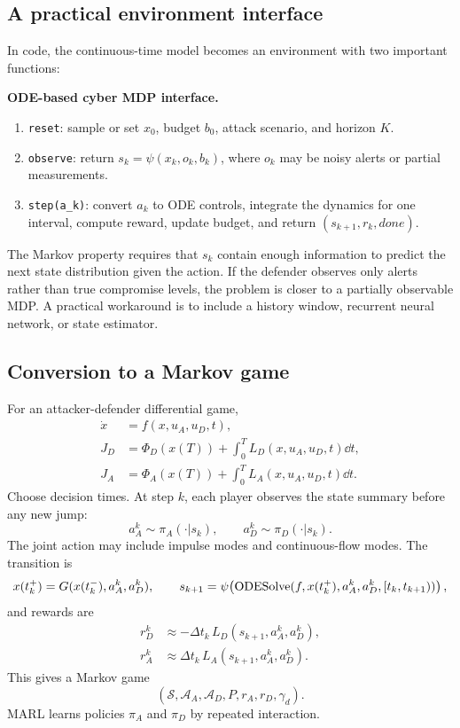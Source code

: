 \documentclass[11pt,a4paper]{article}
\begin{document}
\subsection{A practical environment interface}
In code, the continuous-time model becomes an environment with two important functions:
\begin{methodbox}
\textbf{ODE-based cyber MDP interface.}
\begin{enumerate}
\item \texttt{reset}: sample or set $x_0$, budget $b_0$, attack scenario, and horizon $K$.
\item \texttt{observe}: return $s_k=\psi(x_k,o_k,b_k)$, where $o_k$ may be noisy alerts or partial measurements.
\item \texttt{step(a\_k)}: convert $a_k$ to ODE controls, integrate the dynamics for one interval, compute reward, update budget, and return $(s_{k+1},r_k,done)$.
\end{enumerate}
\end{methodbox}
The Markov property requires that $s_k$ contain enough information to predict the next state distribution given the action. If the defender observes only alerts rather than true compromise levels, the problem is closer to a partially observable MDP. A practical workaround is to include a history window, recurrent neural network, or state estimator.

\subsection{Conversion to a Markov game}
For an attacker-defender differential game,
\begin{align}
\dot{x}&=f(x,u_A,u_D,t),\\
J_D&=\Phi_D(x(T))+\int_0^T L_D(x,u_A,u_D,t)\dd t,\\
J_A&=\Phi_A(x(T))+\int_0^T L_A(x,u_A,u_D,t)\dd t.
\end{align}
Choose decision times. At step $k$, each player observes the state summary before any new jump:
\begin{equation}
a_A^k\sim\pi_A(\cdot|s_k),\qquad a_D^k\sim\pi_D(\cdot|s_k).
\end{equation}
The joint action may include impulse modes and continuous-flow modes. The transition is
\begin{equation}
x(t_k^+)=G(x(t_k^-),a_A^k,a_D^k),\qquad
s_{k+1}=\psi\!\left(\operatorname{ODESolve}(f,x(t_k^+),a_A^k,a_D^k,[t_k,t_{k+1}))\right),
\end{equation}
and rewards are
\begin{align}
r_D^k&\approx-\Delta t_k\,L_D(s_{k+1},a_A^k,a_D^k),\\
r_A^k&\approx\Delta t_k\,L_A(s_{k+1},a_A^k,a_D^k).
\end{align}
This gives a Markov game
\begin{equation}
(\mathcal{S},\mathcal{A}_A,\mathcal{A}_D,P,r_A,r_D,\gamma_d).
\end{equation}
MARL learns policies $\pi_A$ and $\pi_D$ by repeated interaction.
\end{document}
